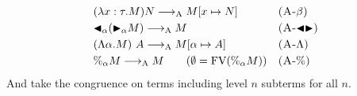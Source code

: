 \begin{center}
    \begin{align*}
        & (\lambda x:\tau.M) N \longrightarrow_{\text{A}} M[x \mapsto N]       &  & \textsc{(A-$\beta$)}   \\
        & {\mathop{\blacktriangleleft}}_\alpha ({\mathop{\blacktriangleright}}_\alpha M) \longrightarrow_{\text{A}} M              &  & \textsc{(A-${\mathop{\blacktriangleleft}}{\mathop{\blacktriangleright}}$)} \\
        & (\Lambda \alpha.M)\ A \longrightarrow_{\text{A}} M[\alpha \mapsto A] &  & \textsc{(A-$\Lambda$)} \\
        & \%_\alpha M \longrightarrow_{\text{A}} M \qquad (\emptyset = \text{FV}(\%_\alpha M)) &  & \textsc{(A-$\%$)}
    \end{align*}
    And take the congruence on terms including level \( n \) subterms for all \( n \).
\end{center}

 \hfil
